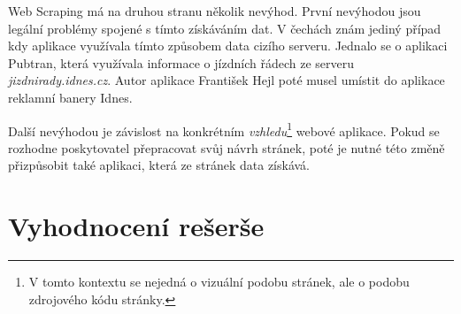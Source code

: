 Web Scraping má na druhou stranu několik nevýhod. První nevýhodou jsou legální problémy spojené s tímto získáváním dat. V čechách znám jediný případ kdy aplikace využívala tímto způsobem data cizího serveru. Jednalo se o aplikaci Pubtran, která využívala informace o jízdních řádech ze serveru \emph{jizdnirady.idnes.cz}. Autor aplikace František Hejl poté musel umístit do aplikace reklamní banery Idnes.

Další nevýhodou je závislost na konkrétním \emph{vzhledu}\footnote{V tomto kontextu se nejedná o vizuální podobu stránek, ale o podobu zdrojového kódu stránky.} webové aplikace. Pokud se rozhodne poskytovatel přepracovat svůj návrh stránek, poté je nutné této změně přizpůsobit také aplikaci, která ze stránek data získává.

\section{Vyhodnocení rešerše}